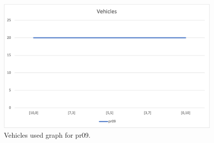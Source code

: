 \begin{figure}[H]
    \centering
    \includegraphics[width=1.0\columnwidth]{../graphs/pr09-vehicles.png}
    \caption{Vehicles used graph for pr09.}
\end{figure}
